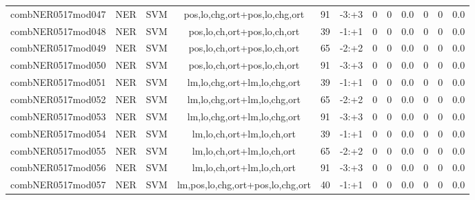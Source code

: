 \documentclass[a4paper]{article}
\begin{document}
\begin{landscape}
\begin{center}
\begin{tabular}{ |c|c|c|c|c|c|c|c|c|c|c|c|}
 
 	
 	\small{ combNER0517mod047 } & NER & SVM & pos,lo,chg,ort+pos,lo,chg,ort  &  91 &  -3:+3  &  0 & 0 & 0.0  &  0 & 0 & 0.0 \\
 	

 
 	
 	\small{ combNER0517mod048 } & NER & SVM & pos,lo,ch,ort+pos,lo,ch,ort  &  39 &  -1:+1  &  0 & 0 & 0.0  &  0 & 0 & 0.0 \\
 	

 
 	
 	\small{ combNER0517mod049 } & NER & SVM & pos,lo,ch,ort+pos,lo,ch,ort  &  65 &  -2:+2  &  0 & 0 & 0.0  &  0 & 0 & 0.0 \\
 	

 
 	
 	\small{ combNER0517mod050 } & NER & SVM & pos,lo,ch,ort+pos,lo,ch,ort  &  91 &  -3:+3  &  0 & 0 & 0.0  &  0 & 0 & 0.0 \\
 	

 
 	
 	\small{ combNER0517mod051 } & NER & SVM & lm,lo,chg,ort+lm,lo,chg,ort  &  39 &  -1:+1  &  0 & 0 & 0.0  &  0 & 0 & 0.0 \\
 	

 
 	
 	\small{ combNER0517mod052 } & NER & SVM & lm,lo,chg,ort+lm,lo,chg,ort  &  65 &  -2:+2  &  0 & 0 & 0.0  &  0 & 0 & 0.0 \\
 	

 
 	
 	\small{ combNER0517mod053 } & NER & SVM & lm,lo,chg,ort+lm,lo,chg,ort  &  91 &  -3:+3  &  0 & 0 & 0.0  &  0 & 0 & 0.0 \\
 	

 
 	
 	\small{ combNER0517mod054 } & NER & SVM & lm,lo,ch,ort+lm,lo,ch,ort  &  39 &  -1:+1  &  0 & 0 & 0.0  &  0 & 0 & 0.0 \\
 	

 
 	
 	\small{ combNER0517mod055 } & NER & SVM & lm,lo,ch,ort+lm,lo,ch,ort  &  65 &  -2:+2  &  0 & 0 & 0.0  &  0 & 0 & 0.0 \\
 	

 
 	
 	\small{ combNER0517mod056 } & NER & SVM & lm,lo,ch,ort+lm,lo,ch,ort  &  91 &  -3:+3  &  0 & 0 & 0.0  &  0 & 0 & 0.0 \\
 	

 
 	
 	\small{ combNER0517mod057 } & NER & SVM & lm,pos,lo,chg,ort+pos,lo,chg,ort  &  40 &  -1:+1  &  0 & 0 & 0.0  &  0 & 0 & 0.0 \\
 	


\end{tabular}
\end{center}
\end{landscape}
\end{document}
